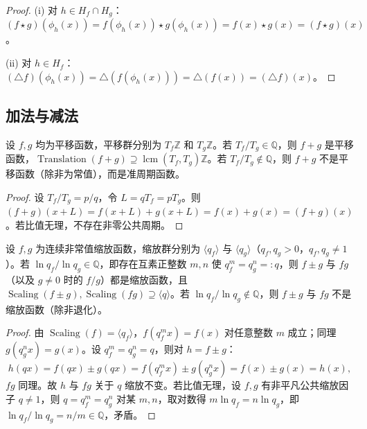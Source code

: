 \begin{proof}
(i) 对 $h\in H_f\cap H_g$：$(f\star g)(\phi_h(x))=f(\phi_h(x))\star g(\phi_h(x))=f(x)\star g(x)=(f\star g)(x)$。

(ii) 对 $h\in H_f$：$(\triangle f)(\phi_h(x))=\triangle(f(\phi_h(x)))=\triangle(f(x))=(\triangle f)(x)$。
\end{proof}

\subsection{加法与减法}

\begin{proposition}[加法下平移性质的保持]\label{prop:add_translation}
设 $f, g$ 均为平移函数，平移群分别为 $T_f\mathbb{Z}$ 和 $T_g\mathbb{Z}$。若 $T_f/T_g \in \mathbb{Q}$，则 $f+g$ 是平移函数，$\operatorname{Translation}(f+g) \supseteq \operatorname{lcm}(T_f, T_g)\mathbb{Z}$。若 $T_f/T_g \notin \mathbb{Q}$，则 $f+g$ 不是平移函数（除非为常值），而是准周期函数。
\end{proposition}

\begin{proof}
设 $T_f/T_g = p/q$，令 $L = qT_f = pT_g$。则 $(f+g)(x+L) = f(x+L) + g(x+L) = f(x) + g(x) = (f+g)(x)$。若比值无理，不存在非零公共周期。
\end{proof}

\begin{proposition}\label{ch8_add_scaling}
设 $f,g$ 为连续非常值缩放函数，缩放群分别为 $\langle q_f\rangle$ 与 $\langle q_g\rangle$（$q_f,q_g>0$，$q_f,q_g\neq 1$）。若 $\ln q_f/\ln q_g\in\mathbb{Q}$，即存在互素正整数 $m,n$ 使 $q_f^m=q_g^n=:q$，则 $f\pm g$ 与 $fg$（以及 $g\neq 0$ 时的 $f/g$）都是缩放函数，且 $\operatorname{Scaling}(f\pm g),\operatorname{Scaling}(fg)\supseteq\langle q\rangle$。若 $\ln q_f/\ln q_g\notin\mathbb{Q}$，则 $f\pm g$ 与 $fg$ 不是缩放函数（除非退化）。
\end{proposition}

\begin{proof}
由 $\operatorname{Scaling}(f)=\langle q_f\rangle$，$f(q_f^m x)=f(x)$ 对任意整数 $m$ 成立；同理 $g(q_g^n x)=g(x)$。设 $q_f^m=q_g^n=q$，则对 $h=f\pm g$：
\[
h(qx)=f(qx)\pm g(qx)=f(q_f^m x)\pm g(q_g^n x)=f(x)\pm g(x)=h(x),
\]
$fg$ 同理。故 $h$ 与 $fg$ 关于 $q$ 缩放不变。若比值无理，设 $f,g$ 有非平凡公共缩放因子 $q\neq 1$，则 $q=q_f^m=q_g^n$ 对某 $m,n$，取对数得 $m\ln q_f=n\ln q_g$，即 $\ln q_f/\ln q_g=n/m\in\mathbb{Q}$，矛盾。
\end{proof}

